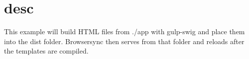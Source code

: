 \chapter{desc}
\hypertarget{md__d_1_2_g_i_t_2_food_link_2foodlink_8client_2node__modules_2bs-recipes_2recipes_2gulp_8swig_2desc}{}\label{md__d_1_2_g_i_t_2_food_link_2foodlink_8client_2node__modules_2bs-recipes_2recipes_2gulp_8swig_2desc}
This example will build HTML files from {\ttfamily ./app} with {\ttfamily gulp-\/swig} and place them into the {\ttfamily dist} folder. Browsersync then serves from that folder and reloads after the templates are compiled. 